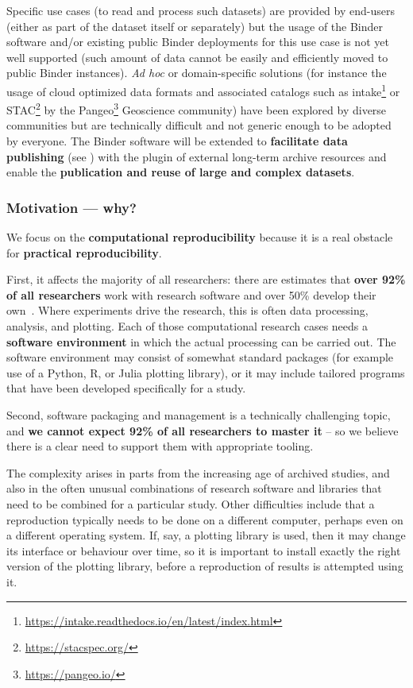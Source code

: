 \begin{compactitem}
      Specific use cases (to read and process such datasets) are provided by end-users (either as part of the dataset
      itself or separately) but the usage of the Binder software and/or existing public Binder deployments for
      this use case is not yet well supported (such amount of data cannot be easily and efficiently moved to
      public Binder instances).
      \emph{Ad hoc} or domain-specific solutions (for instance the usage of cloud optimized
      data formats and associated catalogs such as intake\footnote{\url{https://intake.readthedocs.io/en/latest/index.html}}
      or STAC\footnote{\url{https://stacspec.org/}} by the Pangeo\footnote{\url{https://pangeo.io/}} Geoscience community)
      have been explored by diverse communities but are technically difficult and not generic enough to be
      adopted by everyone. The Binder software will be extended to \textbf{facilitate data publishing} (see ) with
      the plugin of external long-term archive resources and enable the \textbf{publication and reuse of large and complex datasets}.
\end{compactitem}


\subsubsection{Motivation --- why?}\label{sec:motivation-why}

We focus on the \textbf{computational reproducibility} because it is a real
obstacle for \textbf{practical reproducibility}.

First, it affects the majority of all researchers: there are estimates that \textbf{over
92\% of all researchers} work with research software and over 50\% develop
their own~\cite{Hettrick2014}. Where experiments drive the research, this is
often data processing, analysis, and plotting. Each of those computational
research cases needs a \textbf{software environment} in which the actual processing can
be carried out. The software environment may consist of somewhat standard
packages (for example use of a Python, R, or Julia plotting library), or it may
include tailored programs that have been developed specifically for a study.

Second, software packaging and management is a technically challenging topic,
and \textbf{we cannot expect 92\% of all researchers to master it} -- so we believe there
is a clear need to support them with appropriate tooling.

The complexity arises in parts from the increasing age of archived studies, and
also in the often unusual combinations of research software and libraries that
need to be combined for a particular study. Other difficulties include that a
reproduction typically needs to be done on a different computer, perhaps even on
a different operating system. If, say, a plotting library is used, then it may
change its interface or behaviour over time, so it is important to install
exactly the right version of the plotting library, before a reproduction of
results is attempted using it.

